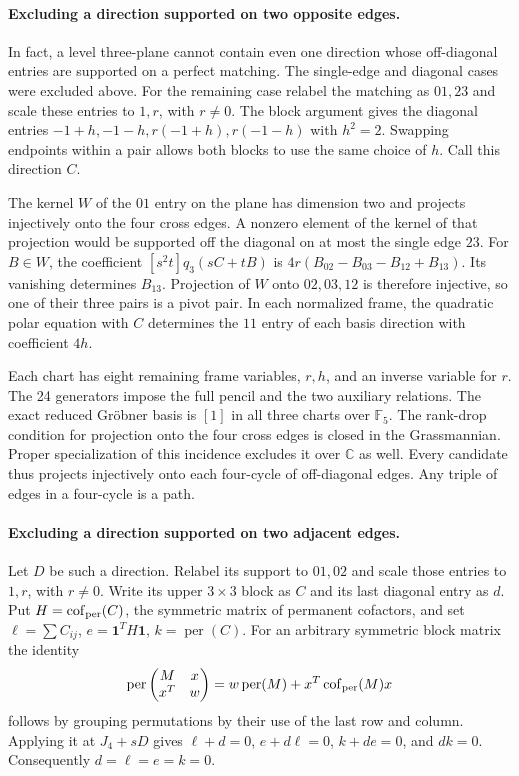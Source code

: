 \paragraph{Excluding a direction supported on two opposite edges.}
In fact, a level three-plane cannot contain even one direction whose
off-diagonal entries are supported on a perfect matching. The
single-edge and diagonal cases were excluded above. For the remaining
case relabel the matching as \(01,23\) and scale these entries to
\(1,r\), with \(r\ne0\). The block argument gives the diagonal
entries \(-1+h,-1-h,r(-1+h),r(-1-h)\) with \(h^2=2\).
Swapping endpoints within a pair allows both blocks to use the same
choice of \(h\). Call this direction \(C\).

The kernel \(W\) of the \(01\) entry on the plane has dimension two
and projects injectively onto the four cross edges. A nonzero element
of the kernel of that projection would be supported off the diagonal
on at most the single edge \(23\). For \(B\in W\), the coefficient
\([s^2t]q_3(sC+tB)\) is
\(4r(B_{02}-B_{03}-B_{12}+B_{13})\).
Its vanishing determines \(B_{13}\). Projection of \(W\) onto
\(02,03,12\) is therefore injective, so one of their three pairs is
a pivot pair. In each normalized frame, the quadratic polar equation
with \(C\) determines the \(11\) entry of each basis direction with
coefficient \(4h\).

Each chart has eight remaining frame variables, \(r,h\), and an
inverse variable for \(r\). The 24 generators impose the full pencil
and the two auxiliary relations. The exact reduced Gr\"obner basis is
\([1]\) in all three charts over \(\mathbb F_5\).
The rank-drop condition for projection onto the four cross edges is
closed in the Grassmannian. Proper specialization of this incidence
excludes it over \(\mathbb C\) as well.
Every candidate thus projects injectively onto each four-cycle of
off-diagonal edges. Any triple of edges in a four-cycle is a path.

\paragraph{Excluding a direction supported on two adjacent edges.}
Let \(D\) be such a direction. Relabel its support to \(01,02\) and
scale those entries to \(1,r\), with \(r\ne0\).
Write its upper \(3\times3\) block as \(C\) and its last diagonal
entry as \(d\). Put \(H=\operatorname{cof}_{\rm per}(C)\), the
symmetric matrix of permanent cofactors, and set
\(\ell=\sum C_{ij}\), \(e=\mathbf1^TH\mathbf1\),
\(k=\operatorname{per}(C)\).
For an arbitrary symmetric block matrix the identity
\[
 \operatorname{per}\begin{pmatrix}M&x\\x^T&w\end{pmatrix}
 =w\operatorname{per}(M)+x^T\operatorname{cof}_{\rm per}(M)x
\]
follows by grouping permutations by their use of the last row and
column. Applying it at \(J_4+sD\) gives
\(\ell+d=0\), \(e+d\ell=0\), \(k+de=0\), and \(dk=0\).
Consequently \(d=\ell=e=k=0\).

